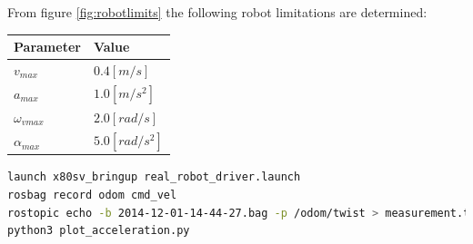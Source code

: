 \documentclass[a4paper]{article}
\begin{document}
From figure \ref{fig:robotlimits} the following robot limitations are determined:

\begin{tabular}{ | l | l | }
  \hline                       
  Parameter & Value \\
  \hline                       
  \hline                       
  $v_{max}$ & $0.4 [m/s] $ \\
  \hline                       
  $a_{max}$ & $ 1.0 [m/s^2] $\\
  \hline                       
  $\omega_{vmax}$ & $ 2.0 [rad/s] $ \\
  \hline                       
  $\alpha_{max}$ & $ 5.0 [rad/s^2] $ \\
  \hline  
\end{tabular}

\begin{lstlisting}[language=bash,caption={commands to determine robot limitations},
    label=lst:robotlimits]
launch x80sv_bringup real_robot_driver.launch
rosbag record odom cmd_vel
rostopic echo -b 2014-12-01-14-44-27.bag -p /odom/twist > measurement.txt
python3 plot_acceleration.py
\end{lstlisting}
\end{document}
